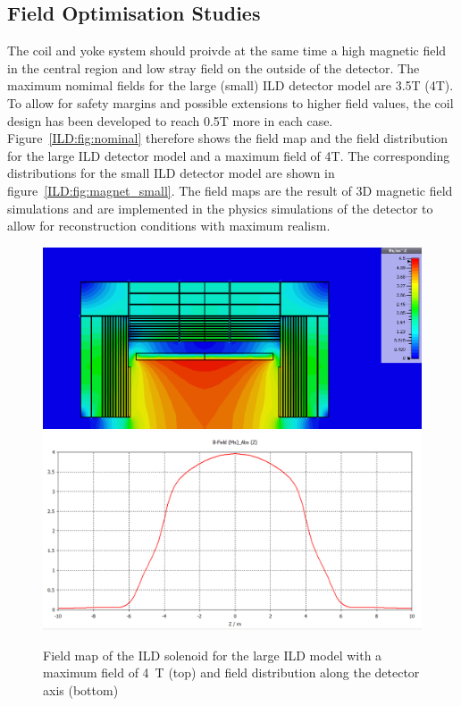 \subsection{Field Optimisation Studies}

The coil and yoke system should proivde at the same time a high magnetic field in the central region and low stray field on the outside of the detector. The maximum nomimal fields for the large (small) ILD detector model are 3.5T (4T). To allow for safety margins and possible extensions to higher field values, the coil design has been developed to reach 0.5T more in each case. Figure~\ref{ILD:fig:nominal} therefore shows the field map and the field distribution for the large ILD detector model and a maximum field of 4T. The corresponding distributions for the small ILD detector model are shown in figure~\ref{ILD:fig:magnet_small}. The field maps are the result of 3D magnetic field simulations and are implemented in the physics simulations of the detector to allow for reconstruction conditions with maximum realism.
\begin{figure}[h!]
    \centering
    \includegraphics[width=0.8\hsize]{Integration/fig/field_nominal_4.png}
    \includegraphics[width=0.8\hsize]{Integration/fig/field_nominal_4_plot.png}
    \caption{Field map of the ILD solenoid for the large ILD model with a maximum field of 4~T (top) and field distribution along the detector axis (bottom)~\cite{ild:bib:Magnet_Simulations}}
    \label{ILD:fig:magnet_nominal}
\end{figure}
